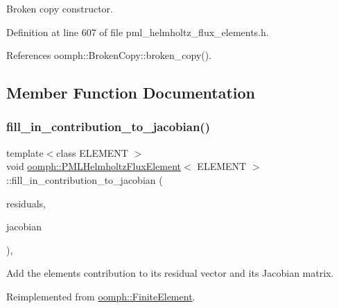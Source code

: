 Broken copy constructor. 



Definition at line 607 of file pml\+\_\+helmholtz\+\_\+flux\+\_\+elements.\+h.



References oomph\+::\+Broken\+Copy\+::broken\+\_\+copy().



\subsection{Member Function Documentation}
\mbox{\label{classoomph_1_1PMLHelmholtzFluxElement_a1d3dd847de79b9758b9bdd40dcbcda3c}} 
\subsubsection{\texorpdfstring{fill\+\_\+in\+\_\+contribution\+\_\+to\+\_\+jacobian()}{fill\_in\_contribution\_to\_jacobian()}}
{\footnotesize\ttfamily template$<$class E\+L\+E\+M\+E\+NT $>$ \\
void \hyperlink{classoomph_1_1PMLHelmholtzFluxElement}{oomph\+::\+P\+M\+L\+Helmholtz\+Flux\+Element}$<$ E\+L\+E\+M\+E\+NT $>$\+::fill\+\_\+in\+\_\+contribution\+\_\+to\+\_\+jacobian (\begin{DoxyParamCaption}\item[{\hyperlink{classoomph_1_1Vector}{Vector}$<$ double $>$ \&}]{residuals,  }\item[{\hyperlink{classoomph_1_1DenseMatrix}{Dense\+Matrix}$<$ double $>$ \&}]{jacobian }\end{DoxyParamCaption})\hspace{0.3cm}{\ttfamily [inline]}, {\ttfamily [virtual]}}



Add the element\textquotesingle{}s contribution to its residual vector and its Jacobian matrix. 



Reimplemented from \hyperlink{classoomph_1_1FiniteElement_a0ae7af222af38a0d53bf283dc85bdfea}{oomph\+::\+Finite\+Element}.




